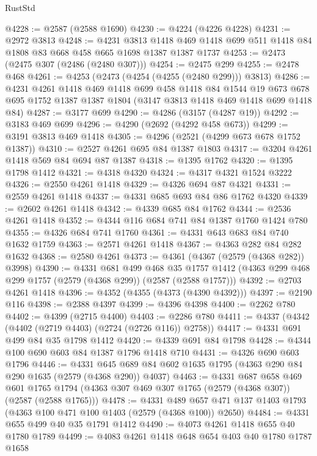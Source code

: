 \begin{lexlean}{RustStd}
\begin{coremodule}
{\begin{coremodule}
{{{{{{{{{{@4228 := @2587 (@2588 @1690)
@4230 := @4224 (@4226 @4228)
@4231 := @2972 @3813
@4248 := @4231
    @3813
    @1418
    @469
    @1418
    @699
    @511
    @1418
    @84
    @1808
    @83
    @668
    @458
    @665
    @1698
    @1387
    @1387
    @1737
@4253 := @2473 (@2475 @307 (@2486 (@2480 @307)))
@4254 := @2475 @299
@4255 := @2478 @468
@4261 := @4253 (@2473 (@4254 (@4255 (@2480 @299))) @3813)
@4286 := @4231
    @4261
    @1418
    @469
    @1418
    @699
    @458
    @1418
    @84
    @1544
    @19
    @673
    @678
    @695
    @1752
    @1387
    @1387
    @1804
    (@3147 @3813 @1418 @469 @1418 @699 @1418 @84)
@4287 := @3177 @699
@4290 := @4286 (@3157 (@4287 @19))
@4292 := @3183 @469 @699
@4296 := @4290 (@2692 (@4292 @458 @673))
@4299 := @3191 @3813 @469 @1418
@4305 := @4296 (@2521 (@4299 @673 @678 @1752 @1387))
@4310 := @2527 @4261 @695 @84 @1387 @1803
@4317 := @3204 @4261 @1418 @569 @84 @694 @87 @1387
@4318 := @1395 @1762
@4320 := @1395 @1798 @1412
@4321 := @4318 @4320
@4324 := @4317 @4321 @1524 @3222
@4326 := @2550 @4261 @1418
@4329 := @4326 @694 @87 @4321
@4331 := @2559 @4261 @1418
@4337 := @4331 @685 @693 @84 @86 @1762 @4320
@4339 := @2602 @4261 @1418
@4342 := @4339 @685 @84 @1762
@4344 := @2536 @4261 @1418
@4352 := @4344 @116 @684 @741 @84 @1387 @1760 @1424 @780
@4355 := @4326 @684 @741 @1760
@4361 := @4331 @643 @683 @84 @740 @1632 @1759
@4363 := @2571 @4261 @1418
@4367 := @4363 @282 @84 @282 @1632
@4368 := @2580 @4261
@4373 := @4361 (@4367 (@2579 (@4368 @282)) @3998)
@4390 := @4331
    @681
    @499
    @468
    @35
    @1757
    @1412
    (@4363 @299 @468 @299 @1757 (@2579 (@4368 @299)) (@2587 (@2588 @1757)))
@4392 := @2703 @4261 @1418
@4396 := @4352 (@4355 (@4373 (@4390 @4392)))
@4397 := @2190 @116
@4398 := @2388 @4397
@4399 := @4396 @4398
@4400 := @2262 @780
@4402 := @4399 (@2715 @4400)
@4403 := @2286 @780
@4411 := @4337 (@4342 (@4402 (@2719 @4403) (@2724 (@2726 @116)) @2758))
@4417 := @4331 @691 @499 @84 @35 @1798 @1412
@4420 := @4339 @691 @84 @1798
@4428 := @4344 @100 @690 @603 @84 @1387 @1796 @1418 @710
@4431 := @4326 @690 @603 @1796
@4446 := @4331 @645 @689 @84 @602 @1635 @1795 (@4363 @290 @84 @290 @1635 (@2579 (@4368 @290)) @4037)
@4463 := @4331
    @687
    @658
    @469
    @601
    @1765
    @1794
    (@4363 @307 @469 @307 @1765 (@2579 (@4368 @307)) (@2587 (@2588 @1765)))
@4478 := @4331
    @489
    @657
    @471
    @137
    @1403
    @1793
    (@4363 @100 @471 @100 @1403 (@2579 (@4368 @100)) @2650)
@4484 := @4331 @655 @499 @40 @35 @1791 @1412
@4490 := @4073 @4261 @1418 @655 @40 @1780 @1789
@4499 := @4083 @4261 @1418 @648 @654 @403 @40 @1780 @1787 @1658
}}}}}}}}}}
\end{coremodule}}
\end{coremodule}
\end{lexlean}
